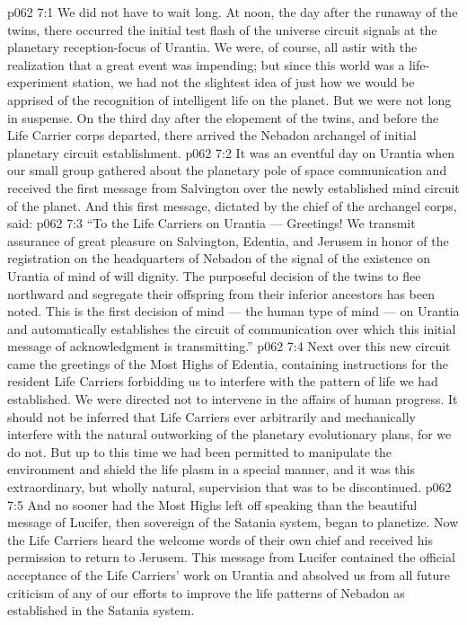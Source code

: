 \vs p062 7:1 We did not have to wait long. At noon, the day after the runaway of the twins, there occurred the initial test flash of the universe circuit signals at the planetary reception\hyp{}focus of Urantia. We were, of course, all astir with the realization that a great event was impending; but since this world was a life\hyp{}experiment station, we had not the slightest idea of just how we would be apprised of the recognition of intelligent life on the planet. But we were not long in suspense. On the third day after the elopement of the twins, and before the Life Carrier corps departed, there arrived the Nebadon archangel of initial planetary circuit establishment.
\vs p062 7:2 It was an eventful day on Urantia when our small group gathered about the planetary pole of space communication and received the first message from Salvington over the newly established mind circuit of the planet. And this first message, dictated by the chief of the archangel corps, said:
\vs p062 7:3 “To the Life Carriers on Urantia --- Greetings! We transmit assurance of great pleasure on Salvington, Edentia, and Jerusem in honor of the registration on the headquarters of Nebadon of the signal of the existence on Urantia of mind of will dignity. The purposeful decision of the twins to flee northward and segregate their offspring from their inferior ancestors has been noted. This is the first decision of mind --- the human type of mind --- on Urantia and automatically establishes the circuit of communication over which this initial message of acknowledgment is transmitting.”
\vs p062 7:4 Next over this new circuit came the greetings of the Most Highs of Edentia, containing instructions for the resident Life Carriers forbidding us to interfere with the pattern of life we had established. We were directed not to intervene in the affairs of human progress. It should not be inferred that Life Carriers ever arbitrarily and mechanically interfere with the natural outworking of the planetary evolutionary plans, for we do not. But up to this time we had been permitted to manipulate the environment and shield the life plasm in a special manner, and it was this extraordinary, but wholly natural, supervision that was to be discontinued.
\vs p062 7:5 And no sooner had the Most Highs left off speaking than the beautiful message of Lucifer, then sovereign of the Satania system, began to planetize. Now the Life Carriers heard the welcome words of their own chief and received his permission to return to Jerusem. This message from Lucifer contained the official acceptance of the Life Carriers’ work on Urantia and absolved us from all future criticism of any of our efforts to improve the life patterns of Nebadon as established in the Satania system.
